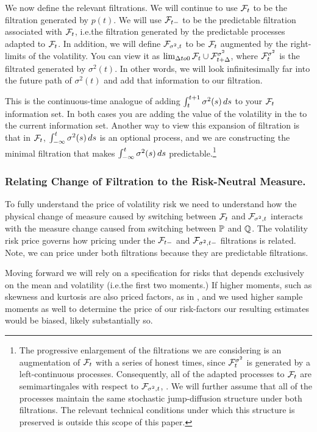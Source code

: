 \documentclass[11pt, letterpaper, twoside, final]{article}
\begin{document}
We now define the relevant filtrations.
We will continue to use $\mathcal{F}_t$ to be the filtration generated by $p(t)$.
We will use $\mathcal{F}_{t-}$ to be the predictable filtration associated with $\mathcal{F}_t$, i.e.\@ the filtration generated by
the predictable processes adapted to $\mathcal{F}_t$.
In addition, we will define $\mathcal{F}_{\sigma^2, t}$ to be $\mathcal{F}_t$ augmented by the right-limits of the volatility. 
You can view it as $\lim_{\Delta to 0} \mathcal{F}_t \cup \mathcal{F}^{\sigma^2}_{t+\Delta}$, where $\mathcal{F}^{\sigma^2}_t$ is the
filtrated generated by $\sigma^2(t)$.
In other words, we will look infinitesimally far into the future path of $\sigma^2(t)$ and add that information to
our filtration.

This is the continuous-time analogue of adding $\int_t^{t+1} \sigma^2(s) \mathop{}\!d s$ to your $\mathcal{F}_t$ information set.
In both cases you are adding the value of the volatility in the  to the current information
set.
Another way to view this expansion of filtration is that in $\mathcal{F}_t$, $\int^t_{-\infty} \sigma^2(s) \mathop{}\!d s$ is an
optional process, and we are constructing the minimal filtration that makes $\int^t_{-\infty} \sigma^2(s) \mathop{}\!d s$
predictable.\footnote{The progressive enlargement of the filtrations we are considering is an augmentation of
    $\mathcal{F}_t$ with a series of honest times, since $\mathcal{F}^{\sigma^2}_{t}$ is generated by a left-continuous processes.
    Consequently, all of the adapted processes to $\mathcal{F}_t$ are semimartingales with respect to $\mathcal{F}_{\sigma^2,t}$,
    \parencite[Theorem C]{barlow1978study}.  We will further assume that all of the processes maintain the same
stochastic jump-diffusion structure under both filtrations. The relevant technical conditions under which this
structure is preserved is outside this scope of this paper.}


\subsubsection{Relating Change of Filtration to the Risk-Neutral Measure.}

To fully understand the price of volatility risk we need to understand how the physical change of measure
caused  by switching between $\mathcal{F}_t$ and $\mathcal{F}_{\sigma^2,t}$ interacts with the measure change caused from switching
between $\mathbb{P}$ and $\mathbb{Q}$.
The volatility risk price governs how pricing under the $\mathcal{F}_{t-}$ and $\mathcal{F}_{\sigma^2,t-}$ filtrations is related.
Note, we can price under both filtrations because they are predictable filtrations.

Moving forward we will rely on a  specification for risks that depends exclusively on the mean and volatility
(i.e.\@ the first two moments.)
If higher moments, such as skewness and kurtosis are also priced factors, as in \textcites{harvey2000conditional,
conrad2012exante, chang2013market},  and we used higher sample moments as well to determine the price of our
risk-factors our resulting estimates would be biased, likely substantially so. 
\end{document}
